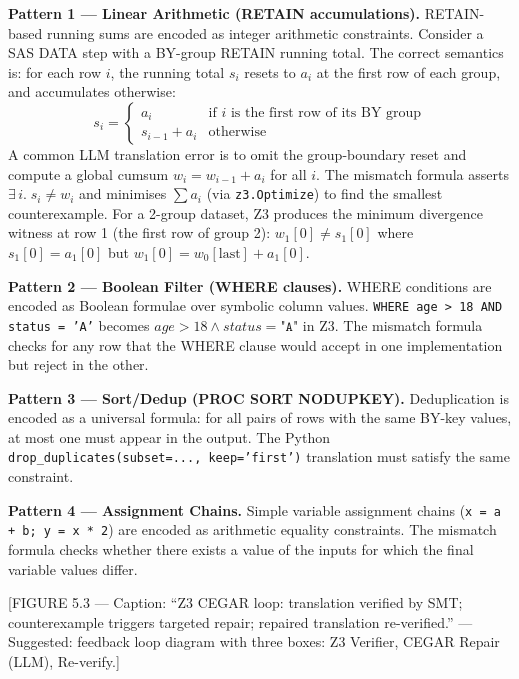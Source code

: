 \textbf{Pattern 1 --- Linear Arithmetic (RETAIN accumulations).}
RETAIN-based running sums are encoded as integer arithmetic constraints.
Consider a SAS DATA step with a BY-group RETAIN running total. The correct
semantics is: for each row $i$, the running total $s_i$ resets to $a_i$ at
the first row of each group, and accumulates otherwise:
\begin{equation}
  s_i =
  \begin{cases}
    a_i & \text{if } i \text{ is the first row of its BY group} \\
    s_{i-1} + a_i & \text{otherwise}
  \end{cases}
  \label{eq:retain-correct}
\end{equation}
A common LLM translation error is to omit the group-boundary reset and
compute a global cumsum $w_i = w_{i-1} + a_i$ for all $i$. The mismatch
formula asserts $\exists\, i.\; s_i \neq w_i$ and minimises $\sum a_i$
(via \texttt{z3.Optimize}) to find the smallest counterexample. For a
2-group dataset, Z3 produces the minimum divergence witness at row 1 (the
first row of group 2): $w_1[0] \neq s_1[0]$ where $s_1[0] = a_1[0]$ but
$w_1[0] = w_0[\text{last}] + a_1[0]$.

\textbf{Pattern 2 --- Boolean Filter (WHERE clauses).}
WHERE conditions are encoded as Boolean formulae over symbolic column values.
\texttt{WHERE age > 18 AND status = 'A'} becomes
$\textit{age} > 18 \wedge \textit{status} = \texttt{"A"}$ in Z3. The mismatch
formula checks for any row that the WHERE clause would accept in one
implementation but reject in the other.

\textbf{Pattern 3 --- Sort/Dedup (PROC SORT NODUPKEY).}
Deduplication is encoded as a universal formula: for all pairs of rows with
the same BY-key values, at most one must appear in the output. The Python
\texttt{drop\_duplicates(subset=..., keep='first')} translation must satisfy
the same constraint.

\textbf{Pattern 4 --- Assignment Chains.}
Simple variable assignment chains (\texttt{x = a + b; y = x * 2}) are encoded
as arithmetic equality constraints. The mismatch formula checks whether there
exists a value of the inputs for which the final variable values differ.

[FIGURE 5.3 --- Caption: ``Z3 CEGAR loop: translation verified by SMT;
counterexample triggers targeted repair; repaired translation re-verified.''
--- Suggested: feedback loop diagram with three boxes: Z3 Verifier, CEGAR
Repair (LLM), Re-verify.]

